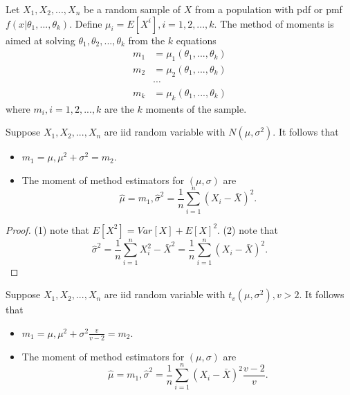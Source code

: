 \begin{refsection}
\begin{definition}\cite[312]{casella2002statistical} Let $X_1,X_2,...,X_n$ be a random sample of $X$ from a population with pdf or pmf $f(x|\theta_1,...,\theta_k)$. Define $\mu_i = E[X^i],i=1,2,...,k$. The method of moments is aimed at solving $\theta_1,\theta_2,...,\theta_k$ from the $k$ equations
	\begin{align*}
	m_1 &= \mu_1(\theta_1,...,\theta_k) \\
	m_2 &= \mu_2(\theta_1,...,\theta_k) \\
	&\cdots \\
	m_k &= \mu_k(\theta_1,...,\theta_k) 
	\end{align*}
where $m_i,i=1,2,...,k$ are the $k$ moments of the sample.			
\end{definition}


\begin{lemma}\cite[312]{casella2002statistical}
Suppose $X_1,X_2,...,X_n$ are iid random variable with $N(\mu, \sigma^2)$. It follows that
\begin{itemize}
	\item $m_1 = \mu, \mu^2 + \sigma^2 = m_2$.
	\item The moment of method estimators for $(\mu, \sigma)$ are
	$$\hat{\mu} = m_1, \hat{\sigma}^2 = \frac{1}{n}\sum_{i=1}^n (X_i - \bar{X})^2.$$
\end{itemize}	
\end{lemma}
\begin{proof}
(1) note that $E[X^2] = Var[X] + E[X]^2$.
(2) note that 
$$\hat{\sigma}^2 = \frac{1}{n}\sum_{i=1}^n X_i^2 - \bar{X}^2 = \frac{1}{n}\sum_{i=1}^n (X_i - \bar{X})^2.$$
\end{proof}



\begin{lemma}\label{ch:theory-of-statistics:th:methodOfMomentsStudentTEstimation}
Suppose $X_1,X_2,...,X_n$ are iid random variable with $t_v(\mu, \sigma^2),v > 2$. It follows that
\begin{itemize}
	\item $m_1 = \mu, \mu^2 + \sigma^2\frac{v}{v-2} = m_2$.
	\item The moment of method estimators for $(\mu, \sigma)$ are
	$$\hat{\mu} = m_1, \hat{\sigma}^2 = \frac{1}{n}\sum_{i=1}^n (X_i - \bar{X})^2 \frac{v-2}{v}.$$
\end{itemize}		
	

\end{lemma}
\end{refsection}
